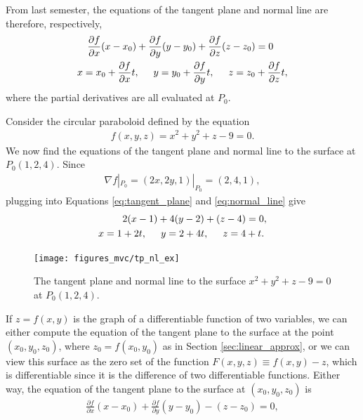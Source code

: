 \documentclass[12pt,letterpaper,reqno]{article}
\numberwithin{equation}{section}
\begin{document}
{From last semester, the equations of the tangent plane and normal line are therefore, respectively, 
\begin{align}\label{eq:tangent_plane}
	\frac{\partial f}{\partial x}(x-x_0)+\frac{\partial f}{\partial y}(y-y_0)+\frac{\partial f}{\partial z}(z-z_0)&=0 \\ \label{eq:normal_line}
	x=x_0+\frac{\partial f}{\partial x}t, \hspace{0.5cm}	y=y_0+\frac{\partial f}{\partial y}t, \hspace{0.5cm} 	z=z_0&+\frac{\partial f}{\partial z}t,
\end{align}
where the partial derivatives are all evaluated at $P_0$.

\begin{example}
Consider the circular paraboloid defined by the equation
\begin{align*}
	f(x,y,z)=x^2+y^2+z-9=0.
\end{align*}	
We now find the equations of the tangent plane and normal line to the surface at $P_0(1,2,4)$. Since 
\begin{align*}
	\nabla f|_{P_0}=(2x,2y,1)|_{P_0}=(2,4,1),
\end{align*}
plugging into Equations \eqref{eq:tangent_plane} and \eqref{eq:normal_line} give
\begin{align*}
	2(x-1)+4(y-2)+(z-4)&=0, \\
	x=1+2t, \hspace{0.5cm} y=2+4t, \hspace{0.5cm} z=4&+t.
\end{align*}
\end{example}

\begin{figure}[h]
	\centering
	\texttt{[image: figures\_mvc/tp\_nl\_ex]}
	\caption{The tangent plane and normal line to the surface $x^2+y^2+z-9=0$ at $P_0(1,2,4)$.}
\end{figure}

If $z=f(x,y)$ is the graph of a differentiable function of two variables, we can either compute the equation of the tangent plane to the surface at the point $(x_0,y_0,z_0)$, where $z_0=f(x_0,y_0)$ as in Section \ref{sec:linear_approx}, or we can view this surface as the zero set of the function $F(x,y,z)\equiv f(x,y)-z$, which is differentiable since it is the difference of two differentiable functions. Either way, the equation of the tangent plane to the surface at $(x_0,y_0,z_0)$ is
\begin{align*}
	\frac{\partial f}{\partial x}(x-x_0)+\frac{\partial f}{\partial y}(y-y_0)-(z-z_0)=0,
\end{align*}

}
\end{document}
